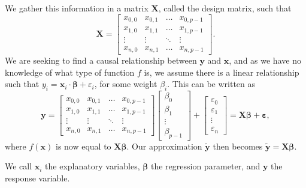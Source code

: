 \documentclass{article}
\begin{document}
We gather this information in a matrix $\boldsymbol{X}$, called the design matrix, such that
\begin{equation*}
    \boldsymbol{X} =
    \begin{bmatrix}
        x_{0,0} & x_{0,1} & \ldots & x_{0, p-1} \\
        x_{1,0} & x_{1,1} & \ldots & x_{1, p-1} \\
        \vdots & \vdots & \ddots & \vdots \\
        x_{n,0} & x_{n,1} & \ldots & x_{n, p-1}
    \end{bmatrix}.
\end{equation*}
We are seeking to find a causal relationship between $\boldsymbol{y}$ and $\boldsymbol{x}$, and as we have no knowledge of what type of function $f$ is, we assume there is a linear relationship such that $y_i = \boldsymbol{x}_i \cdot \boldsymbol{\beta} + \varepsilon_i$, for some weight $\beta_i$. This can be written as
\begin{equation*}
    \boldsymbol{y} = \begin{bmatrix}
        x_{0,0} & x_{0,1} & \ldots & x_{0, p-1} \\
        x_{1,0} & x_{1,1} & \ldots & x_{1, p-1} \\
        \vdots & \vdots & \ddots & \vdots \\
        x_{n,0} & x_{n,1} & \ldots & x_{n, p-1}
    \end{bmatrix}
    \begin{bmatrix}
        \beta_0 \\ \beta_1 \\ \vdots \\ \beta_{p-1}
    \end{bmatrix}
    +
    \begin{bmatrix}
        \varepsilon_0 \\ \varepsilon_1 \\ \vdots \\ \varepsilon_{n}
    \end{bmatrix}
    = \boldsymbol{X} \boldsymbol{\beta} + \boldsymbol{\varepsilon},
\end{equation*}
where $f(\boldsymbol{x})$ is now equal to $\boldsymbol{X\beta}$. Our approximation $\boldsymbol{\tilde{y}}$ then becomes $\boldsymbol{\tilde{y}} = \boldsymbol{X\beta}$.

We call $\boldsymbol{x}_i$ the explanatory variables, $\boldsymbol{\beta}$ the regression parameter, and $\boldsymbol{y}$ the response variable.
\end{document}
